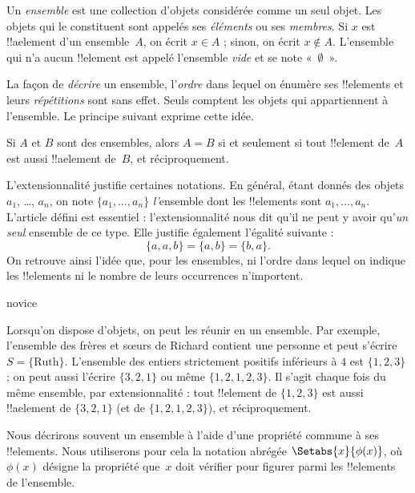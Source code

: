 \documentclass[../../../include/open-logic-section]{subfiles}
\begin{document}

Un \emph{ensemble} est une collection d'objets considérée comme un seul
objet. Les objets qui le constituent sont appelés ses \emph{éléments}
ou ses \emph{membres}. Si $x$ est !!a{element} d'un ensemble~$A$,
on écrit $x \in A$ ; sinon, on écrit $x \notin A$. L'ensemble qui n'a
aucun !!{element} est appelé l'ensemble \emph{vide} et se note
«~$\emptyset$~».

\begin{explain}
La façon de \emph{décrire} un ensemble, l'\emph{ordre} dans
lequel on énumère ses !!{element}s et leurs \emph{répétitions}
sont sans effet. Seuls comptent les objets qui appartiennent
à l'ensemble. Le principe suivant exprime cette idée.
\end{explain}

\begin{defn}[Extensionnalité]
  Si $A$ et $B$ sont des ensembles, alors $A = B$ si et seulement si
  tout !!{element} de~$A$ est aussi !!a{element} de~$B$, et
  réciproquement.
\end{defn}

L'extensionnalité justifie certaines notations. En général, étant donnés
des objets $a_{1}$, \dots, $a_{n}$, on note $\{a_{1}, \dots, a_{n}\}$
\emph{l'}ensemble dont les !!{element}s sont $a_1, \ldots, a_n$.
L'article défini est essentiel : l'extensionnalité nous dit qu'il ne
peut y avoir qu'\emph{un seul} ensemble de ce type. Elle justifie
également l'égalité suivante :
  \[
    \{a, a, b\} = \{a, b\} = \{b,a\}.
  \]
On retrouve ainsi l'idée que, pour les ensembles, ni l'ordre dans
lequel on indique les !!{element}s ni le nombre de leurs occurrences
n'importent.

\begin{tagblock}{novice}
\begin{ex}
Lorsqu'on dispose d'objets, on peut les réunir en un ensemble.
Par exemple, l'ensemble des frères et sœurs de Richard contient
une personne et peut s'écrire $S=\{\textrm{Ruth}\}$.
L'ensemble des entiers strictement positifs inférieurs à $4$ est
$\{1, 2, 3\}$ ; on peut aussi l'écrire $\{3, 2, 1\}$ ou même
$\{1, 2, 1, 2, 3\}$. Il s'agit chaque fois du même ensemble,
par extensionnalité : tout !!{element} de $\{1, 2, 3\}$ est aussi
!!a{element} de $\{3, 2, 1\}$ (et de $\{1, 2, 1, 2, 3\}$), et
réciproquement.
\end{ex}
\end{tagblock}

Nous décrirons souvent un ensemble à l'aide d'une propriété commune
à ses !!{element}s. Nous utiliserons pour cela la notation abrégée
$\Setabs{x}{\phi(x)}$, où $\phi(x)$ désigne la propriété que~$x$
doit vérifier pour figurer parmi les !!{element}s de l'ensemble.
\end{document}
